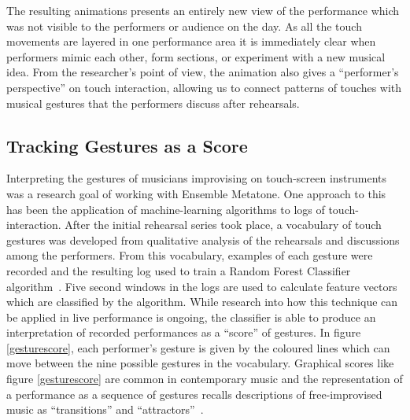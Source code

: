 \documentclass{chi-ext}
\begin{document}
The resulting animations presents an entirely new view of the
performance which was not visible to the performers or audience on the
day.
As all the touch movements are layered in one performance area it is
immediately clear when performers mimic each other, form sections, or
experiment with a new musical idea. From the
researcher's point of view, the animation also gives a ``performer's
perspective'' on touch interaction, allowing us to connect patterns of
touches with musical gestures that the performers discuss after
rehearsals.


\subsection{Tracking Gestures as a Score}

Interpreting the gestures of musicians improvising on touch-screen
instruments was a research goal of working with Ensemble Metatone. One
approach to this has been the application of machine-learning
algorithms to logs of touch-interaction. After the initial rehearsal
series took place, a vocabulary of touch gestures was developed from
qualitative analysis of the rehearsals and discussions among the
performers. From this vocabulary, examples of each gesture were
recorded and the resulting log used to train a Random Forest
Classifier algorithm~\cite{Breiman:2001kx}. Five second windows in the logs are used to calculate
feature vectors which are classified by the algorithm. While research
into how this technique can be applied in live performance is ongoing,
the classifier is able to produce an interpretation of recorded
performances as a ``score'' of gestures. In figure \ref{gesturescore},
each performer's gesture is given by the coloured lines which can move
between the nine possible gestures in the vocabulary. Graphical scores
like figure \ref{gesturescore} are common in contemporary music and
the representation of a performance as a sequence of gestures recalls
descriptions of free-improvised music as ``transitions'' and
``attractors''~\cite{Stenstrom:2009xy}. 

\end{document}
